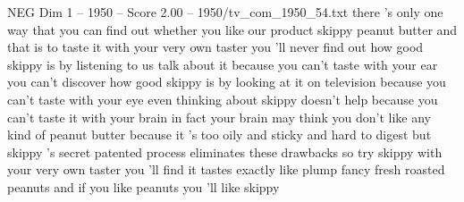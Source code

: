 \begin{textsample}{NEG Dim 1 – 1950 – Score 2.00 – 1950/tv\_com\_1950\_54.txt}  \label{ex:f1_neg_088}
there 's only one way that you can find out whether you like our product skippy peanut butter and that is to taste it with your very own taster you 'll never find out how good skippy is by listening to us talk about it because you can't taste with your ear you can't discover how good skippy is by looking at it on television because you can't taste with your eye even thinking about skippy doesn't help because you can't taste it with your brain in fact your brain may think you don't like any kind of peanut butter because it 's too oily and sticky and hard to digest but skippy 's secret patented process eliminates these drawbacks so try skippy with your very own taster you 'll find it tastes exactly like plump fancy fresh roasted peanuts and if you like peanuts you 'll like skippy

\end{textsample}
